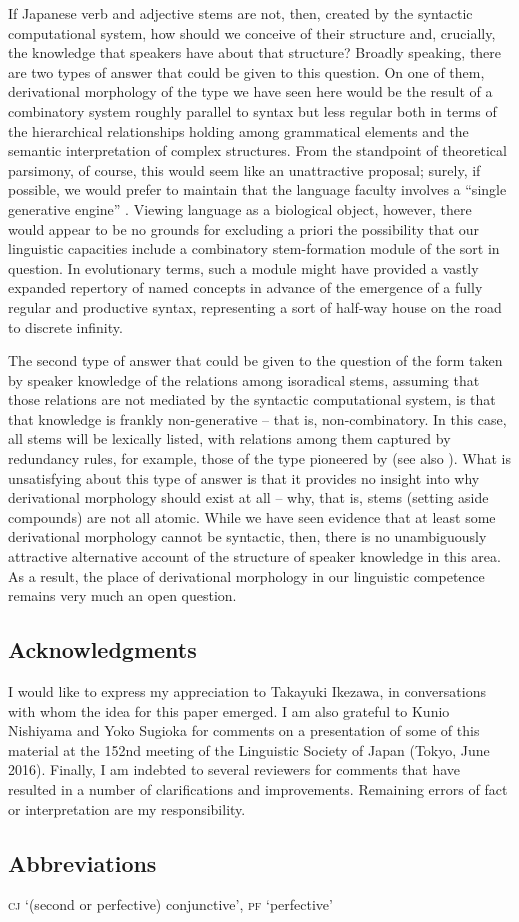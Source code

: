 \documentclass[output=paper,
modfonts
]{LSP/langsci}
\begin{document}
If Japanese verb and adjective stems are not, then, created by the
syntactic computational system, how should we conceive of their
structure and, crucially, the knowledge that speakers have about that
structure? Broadly speaking, there are two types of answer that could be
given to this question. On one of them, derivational morphology of the
type we have seen here would be the result of a combinatory system
roughly parallel to syntax but less regular both in terms of the
hierarchical relationships holding among grammatical elements and the
semantic interpretation of complex structures. From the standpoint of
theoretical parsimony, of course, this would seem like an unattractive
proposal; surely, if possible, we would prefer to maintain that the
language faculty involves a ``single generative engine'' \citep{marantz2001a,marantz2005a}. Viewing language as a biological object, however, there would appear to be no grounds for excluding a priori the possibility that our linguistic capacities include a combinatory stem-formation module of the sort in question. In evolutionary terms, such a module might have
provided a vastly expanded repertory of named concepts in advance of the
emergence of a fully regular and productive syntax, representing a sort
of half-way house on the road to discrete infinity.

The second type of answer that could be given to the question of the
form taken by speaker knowledge of the relations among isoradical stems,
assuming that those relations are not mediated by the syntactic
computational system, is that that knowledge is frankly
non-generative -- that is, non-combinatory. In this case, all stems will
be lexically listed, with relations among them captured by redundancy
rules, for example, those of the type pioneered by \citet{jackendoff1975a} (see also \citealt[53]{jackendoff2002a}). What is unsatisfying about this type of answer is that it provides no insight into why derivational morphology should
exist at all -- why, that is, stems (setting aside compounds) are not all
atomic. While we have seen evidence that at least some derivational
morphology cannot be syntactic, then, there is no unambiguously
attractive alternative account of the structure of speaker knowledge in
this area. As a result, the place of derivational morphology in our
linguistic competence remains very much an open question.

\subsection*{Acknowledgments} I would like to express my appreciation to
Takayuki Ikezawa, in conversations with whom the idea for this paper
emerged. I am also grateful to Kunio Nishiyama and Yoko Sugioka for
comments on a presentation of some of this material at the 152nd meeting
of the Linguistic Society of Japan (Tokyo, June 2016). Finally, I am
indebted to several reviewers for comments that have resulted in a
number of clarifications and improvements. Remaining errors of fact or
interpretation are my responsibility.

\subsection*{Abbreviations}
\textsc{cj} `(second or perfective) conjunctive', \textsc{pf} `perfective'

\nocite{unknown-a,unknown-b}

\printbibliography[heading=subbibliography,notkeyword=this]
\end{document}
